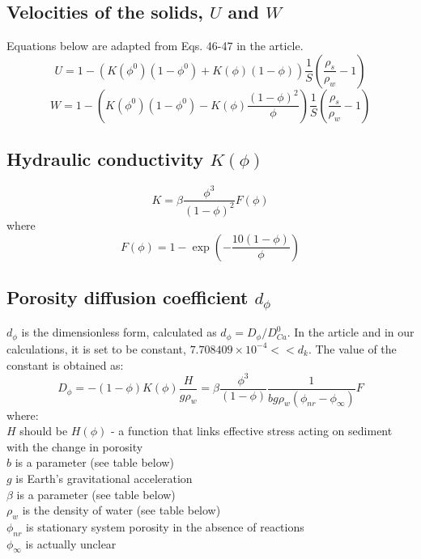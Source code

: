 \documentclass[10pt, letterpaper]{article}
\begin{document}
\subsection{Velocities of the solids, $U$ and $W$}
Equations below are adapted from Eqs. 46-47 in the article.
\begin{equation}
    U = 1 - \left(K(\phi^0)(1-\phi^0) + K(\phi)(1-\phi)\right) \frac{1}{S}\left(\frac{\rho_s}{\rho_w}-1\right) \nonumber
\end{equation}
\begin{equation}
    W = 1 - \left(K(\phi^0)(1-\phi^0) - K(\phi) \frac{(1-\phi)^2}{\phi}\right)\frac{1}{S}\left(\frac{\rho_s}{\rho_w}-1\right) \nonumber
\end{equation}

\subsection{Hydraulic conductivity $K(\phi)$}

\begin{equation}
    K = \beta \frac{\phi^3}{(1 - \phi)^2}F(\phi) \tag{15}
\end{equation}
where
\begin{equation}
    F(\phi) = 1 - \exp\left( -\frac{10(1-\phi)}{\phi} \right) \tag{17}
\end{equation}

\subsection{Porosity diffusion coefficient $d_{\phi}$}
$d_{\phi}$ is the dimensionless form, calculated as $d_{\phi} = D_{\phi}/D_{Ca}^0$. 
In the article and in our calculations, it is set to be constant, $7.708409\times10^{-4} << d_k$. The value of the constant is obtained as:
\begin{equation}
    D_{\phi} = -\left(1 - \phi\right)K(\phi)\frac{H}{g\rho_w} = \beta\frac{\phi^3}{(1 - \phi)}\frac{1}{bg\rho_w(\phi_{nr}-\phi_{\infty})}F \tag{25}
\end{equation}
where:\\
$H$ should be $H(\phi)$ - a function that links effective stress acting on sediment with the change in porosity\\
$b$ is a parameter (see table below)\\
$g$ is Earth's gravitational acceleration\\
$\beta$ is a parameter (see table below)\\
$\rho_w$ is the density of water (see table below)\\
$\phi_{nr}$ is stationary system porosity in the absence of reactions\\
$\phi_{\infty}$ is actually unclear
\end{document}
